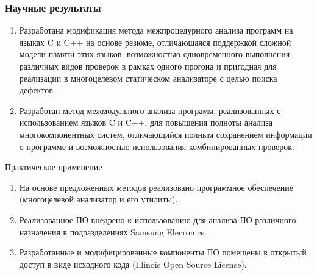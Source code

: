 \documentclass[10pt,gray]{beamer}
\begin{document}


\begin{frame}
\frametitle{Научные результаты}

\begin{enumerate}
  \item Разработана модификация метода межпроцедурного анализа программ на языках C и C++ на основе резюме, отличающаяся поддержкой сложной модели памяти этих языков, возможностью одновременного выполнения различных видов проверок в рамках одного прогона и пригодная для реализации в многоцелевом статическом анализаторе с целью поиска дефектов.
  \item Разработан метод межмодульного анализа программ, реализованных с использованием языков C и C++, для повышения полноты анализа многокомпонентных систем, отличающийся полным сохранением информации о программе и возможностью использования комбинированных проверок.
\end{enumerate}
\end{frame}

\begin{frame}
{\Large Практическое применение}
\begin{enumerate}
  \item На основе предложенных методов реализовано программное обеспечение (многоцелевой анализатор и его утилиты).
  \item Реализованное ПО внедрено к использованию для анализа ПО различного назначения в подразделениях Samsung Elecronics.%
  \item Разработанные и модифицированные компоненты ПО помещены в открытый доступ в виде исходного кода (Illinois Open Source License).
\end{enumerate}

\end{frame}
\end{document}
